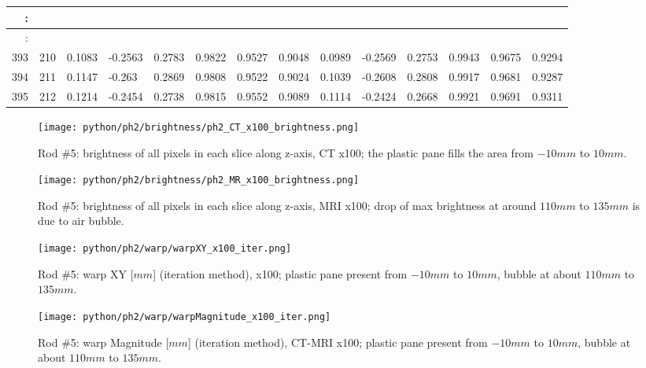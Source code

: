 \begin{table}[p]
{\begin{minipage}{\textheight}
\begin{tabular}{rr||lll|lll||lll|lll}
:      &      &         &         &        &        &        &        &         &         &        &        &        &        \\
\hline
:      &      &         &         &        &        &        &        &         &         &        &        &        &        \\
393    & 210  & 0.1083  & -0.2563 & 0.2783 & 0.9822 & 0.9527 & 0.9048 & 0.0989  & -0.2569 & 0.2753 & 0.9943 & 0.9675 & 0.9294 \\
394    & 211  & 0.1147  & -0.263  & 0.2869 & 0.9808 & 0.9522 & 0.9024 & 0.1039  & -0.2608 & 0.2808 & 0.9917 & 0.9681 & 0.9287 \\
395    & 212  & 0.1214  & -0.2454 & 0.2738 & 0.9815 & 0.9552 & 0.9089 & 0.1114  & -0.2424 & 0.2668 & 0.9921 & 0.9691 & 0.9311
 \end{tabular}
        \label{tab:spit-out-5}
      \end{minipage}
    }
  \end{table}

\begin{figure}[!tbh]
    \centering
    \texttt{[image: python/ph2/brightness/ph2\_CT\_x100\_brightness.png]}
    \caption[Rod \#5: brightness along z-axis, CT x100.]{Rod \#5: brightness of all pixels in each slice along z-axis, CT x100; the plastic pane fills the area from $-10mm$ to $10mm$.}
    \label{fig:ph2_CT_x100_brightness}
\end{figure}

\begin{figure}[!tbh]
    \centering
    \texttt{[image: python/ph2/brightness/ph2\_MR\_x100\_brightness.png]}
    \caption[Rod \#5: brightness along z-axis, MRI x100.]{Rod \#5: brightness of all pixels in each slice along z-axis, MRI x100; drop of max brightness at around $110mm$ to $135mm$ is due to air bubble.}
    \label{fig:ph2_MR_x100_brightness}
\end{figure}


\begin{figure}[!bth]
  \centering
  \texttt{[image: python/ph2/warp/warpXY\_x100\_iter.png]}
  \caption[Rod \#5: warp XY (iteration method), CT-MRI x100.]{Rod \#5: warp XY [$mm$] (iteration method), x100; plastic pane present from $-10mm$ to $10mm$, bubble at about $110mm$ to $135mm$.}
  \label{fig:ph2_warpXY_x100}
\end{figure}

\begin{figure}[!tbh]
    \centering
    \texttt{[image: python/ph2/warp/warpMagnitude\_x100\_iter.png]}
    \caption[Rod \#5: warp Magnitude (iteration method), CT-MRI x100.]{Rod \#5: warp Magnitude [$mm$] (iteration method), CT-MRI x100; plastic pane present from $-10mm$ to $10mm$, bubble at about $110mm$ to $135mm$.}
    \label{fig:ph2_warpMagnitude_x100}
\end{figure}

